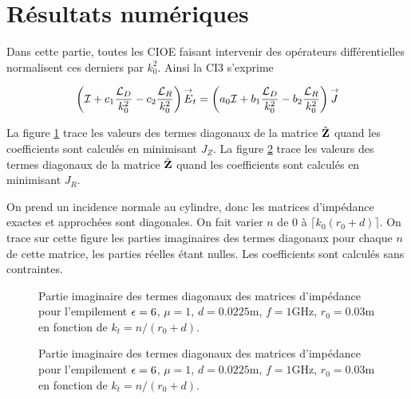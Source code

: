 \section{Résultats numériques}

  Dans cette partie, toutes les CIOE faisant intervenir des opérateurs différentielles normalisent ces derniers par \(k_0^2\). Ainsi la CI3 s'exprime
    
  \begin{equation*}
    \left({\mathcal{I}} + c_1\dfrac{{\mathcal{L}_D}}{k_0^2} -c_2\dfrac{{\mathcal{L}_R}}{k_0^2}\right){\overset{\rightarrow}{E}}_t = \left(a_0{\mathcal{I}} + b_1\dfrac{{\mathcal{L}_D}}{k_0^2} - b_2 \dfrac{{\mathcal{L}_R}}{k_0^2} \right){\overset{\rightarrow}{J}}
  \end{equation*}



  La figure \ref{fig:imp_fourier:cylindre:hoppe:62:hoibc:mode_2} trace les valeurs des termes diagonaux de la matrice \(\hat{\mathbf{Z}}\) quand les coefficients sont calculés en minimisant \(J_Z\).
  La figure \ref{fig:imp_fourier:cylindre:hoppe:62:hoibc:mode_1} trace les valeurs des termes diagonaux de la matrice \(\hat{\mathbf{Z}}\) quand les coefficients sont calculés en minimisant \(J_R\).

  On prend un incidence normale au cylindre, donc les matrices d'impédance exactes et approchées sont diagonales. On fait varier \(n\) de 0 à \(\lceil k_0 (r_0+d) \rceil\). On trace sur cette figure les parties imaginaires des termes diagonaux pour chaque \(n\) de cette matrice, les parties réelles étant nulles. Les coefficients sont calculés sans contraintes.

  \begin{figure}[!hbt]
    \centering
    
    \caption[CIOE sur empilement de Hoppe & Rahmat-Samii p.~62]{Partie imaginaire des termes diagonaux des matrices d'impédance pour l'empilement \(\epsilon = 6\), \(\mu = 1\), \(d=0.0225\text{m}\), \(f=1\text{GHz}\), \(r_0=0.03\text{m}\) en fonction de \(k_t = n / (r_0+d)\).}
    \label{fig:imp_fourier:cylindre:hoppe:62:hoibc:mode_2}
  \end{figure}

  \begin{figure}[!hbt]
    \centering
    
    \caption[CIOE sur empilement de Hoppe & Rahmat-Samii p.~62]{Partie imaginaire des termes diagonaux des matrices d'impédance pour l'empilement \(\epsilon = 6\), \(\mu = 1\), \(d=0.0225\text{m}\), \(f=1\text{GHz}\), \(r_0=0.03\text{m}\) en fonction de \(k_t = n / (r_0+d)\).}
    \label{fig:imp_fourier:cylindre:hoppe:62:hoibc:mode_1}
  \end{figure}

